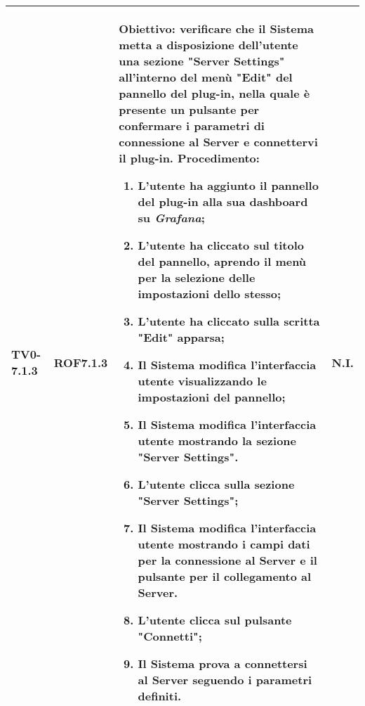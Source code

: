 \begin{longtable}{|C{.15\textwidth}|C{.13\textwidth}|m{.52\textwidth}|C{.08\textwidth}|}
TV0-7.1.3 & ROF7.1.3 &
	\textbf{Obiettivo}: verificare che il Sistema metta a disposizione dell'utente una sezione "Server Settings" all'interno del menù "Edit" del pannello del plug-in, nella quale è presente un pulsante per confermare i parametri di connessione al Server e connettervi il plug-in. \newline
	\textbf{Procedimento}:
	\begin{enumerate}
		\item L'utente ha aggiunto il pannello del plug-in alla sua dashboard su \textit{Grafana};
		\item L'utente ha cliccato sul titolo del pannello, aprendo il menù per la selezione delle impostazioni dello stesso;
		\item L'utente ha cliccato sulla scritta "Edit" apparsa;
		\item Il Sistema modifica l'interfaccia utente visualizzando le impostazioni del pannello;
		\item Il Sistema modifica l'interfaccia utente mostrando la sezione "Server Settings".
		\item L'utente clicca sulla sezione "Server Settings";
		\item Il Sistema modifica l'interfaccia utente mostrando i campi dati per la connessione al Server e il pulsante per il collegamento al Server.
		\item L'utente clicca sul pulsante "Connetti";
		\item Il Sistema prova a connettersi al Server seguendo i parametri definiti.
	\end{enumerate}
	& N.I. \\
\hline


\end{longtable}
